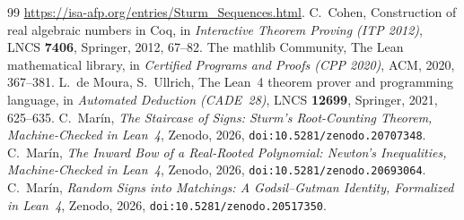 \documentclass[11pt]{article}
\begin{document}
\begin{thebibliography}{99}
\url{https://isa-afp.org/entries/Sturm_Sequences.html}.
 C.~Cohen, Construction of real algebraic numbers in Coq, in \emph{Interactive Theorem
Proving (ITP 2012)}, LNCS \textbf{7406}, Springer, 2012, 67--82.
 The mathlib Community, The Lean mathematical library, in \emph{Certified Programs and
Proofs (CPP 2020)}, ACM, 2020, 367--381.
 L.~de Moura, S.~Ullrich, The Lean~4 theorem prover and programming language, in
\emph{Automated Deduction (CADE~28)}, LNCS \textbf{12699}, Springer, 2021, 625--635.
 C.~Mar\'in, \emph{The Staircase of Signs: Sturm's Root-Counting Theorem,
Machine-Checked in Lean~4}, Zenodo, 2026, \texttt{doi:10.5281/zenodo.20707348}.
 C.~Mar\'in, \emph{The Inward Bow of a Real-Rooted Polynomial: Newton's Inequalities,
Machine-Checked in Lean~4}, Zenodo, 2026, \texttt{doi:10.5281/zenodo.20693064}.
 C.~Mar\'in, \emph{Random Signs into Matchings: A Godsil--Gutman Identity, Formalized
in Lean~4}, Zenodo, 2026, \texttt{doi:10.5281/zenodo.20517350}.
\end{thebibliography}
\end{document}
